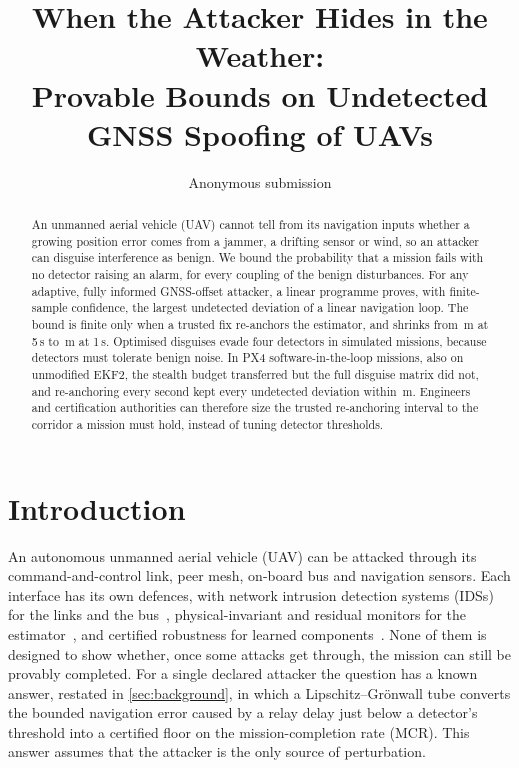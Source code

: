 \documentclass[letterpaper,twocolumn,10pt]{article}
\theoremstyle{remark}
\begin{document}
\date{}
\title{\Large \bf When the Attacker Hides in the Weather:\\
Provable Bounds on Undetected GNSS Spoofing of UAVs}
\author{{\rm Anonymous submission}}
\maketitle

\begin{abstract}
An unmanned aerial vehicle (UAV) cannot tell from its navigation inputs whether a growing position error comes from a
jammer, a drifting sensor or wind, so an attacker can disguise interference as benign. We bound
the probability that a mission fails with no detector raising an alarm, for every coupling of the
benign disturbances. For any adaptive, fully informed GNSS-offset attacker, a linear programme
proves, with finite-sample confidence, the largest undetected deviation of a linear navigation
loop. The bound is finite only when a trusted fix re-anchors the estimator, and shrinks from
\nBoundTaFive\,m at 5\,s to \nBoundTaOne\,m at 1\,s. Optimised disguises evade four detectors in
\nMissionsTotal{} simulated missions, because detectors must tolerate benign noise. In
\nPxMissionsAll{} PX4 software-in-the-loop missions, also on unmodified EKF2, the stealth budget
transferred but the full disguise matrix did not, and re-anchoring every second kept every undetected deviation within
\nPxTaWorstDOneGate\,m. Engineers and certification authorities can therefore size the trusted
re-anchoring interval to the corridor a mission must hold, instead of tuning detector thresholds.
\end{abstract}

\section{Introduction}
\label{sec:intro}
An autonomous unmanned aerial vehicle (UAV) can be attacked through its command-and-control link, peer
mesh, on-board bus and navigation sensors.
Each interface has its own defences, with network intrusion detection
systems (IDSs) for the links and the
bus~\cite{zeng2025uavids,kim2022uavcan,whelan2020novelty}, physical-invariant
and residual monitors for the estimator~\cite{choi2018,quinonez2020savior,dash2019},
and certified robustness for learned
components~\cite{cohen2019smoothing,lecuyer2019}. None of them is designed
to show whether, once some attacks get through, the mission can still be
provably completed. For a single
declared attacker the question has a known answer, restated in
\cref{sec:background}, in which a Lipschitz--Gr\"onwall tube converts the
bounded navigation error caused by a relay delay just below a detector's
threshold into a certified floor on the mission-completion rate (MCR). This
answer assumes that the attacker is the only source of perturbation.
\end{document}
